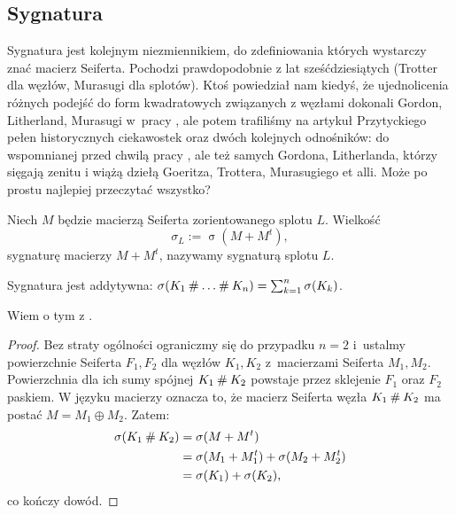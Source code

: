 
\subsection{Sygnatura}
\label{sub:signature}%
%
Sygnatura jest kolejnym niezmiennikiem, do zdefiniowania których wystarczy znać macierz Seiferta.
Pochodzi prawdopodobnie z lat sześćdziesiątych (Trotter \cite{trotter1962} dla węzłów, Murasugi \cite{murasugi1965} dla splotów).
%
%
Ktoś powiedział nam kiedyś, że ujednolicenia różnych podejść do form kwadratowych związanych z węzłami dokonali Gordon, Litherland, Murasugi w~pracy \cite{litherland1981}, ale potem trafiliśmy na artykuł Przytyckiego \cite{przytycki2011} pełen historycznych ciekawostek oraz dwóch kolejnych odnośników: do wspomnianej przed chwilą pracy \cite{murasugi1965}, ale też \cite{gordon1978} samych Gordona, Litherlanda, którzy sięgają zenitu i wiążą dziełą Goeritza, Trottera, Murasugiego et alli.
Może po prostu najlepiej przeczytać wszystko?

\begin{definition}[sygnatura]
\label{def:signature}%
    Niech $M$ będzie macierzą Seiferta zorientowanego splotu $L$.
    Wielkość
    \begin{equation}
        \sigma_L := \operatorname{\sigma} (M + M^t),
    \end{equation}
    sygnaturę macierzy $M + M^t$, nazywamy sygnaturą splotu $L$.
\end{definition}

\begin{proposition}
\label{prp:signature_additive}%
    Sygnatura jest addytywna: $\sigma(K_1 \mathbin{\#} \ldots \mathbin{\#} K_n) = \sum_{k=1}^n \sigma(K_k)$.
\end{proposition}

Wiem o tym z \cite[s. 127]{murasugi1996}.

\begin{proof}
    Bez straty ogólności ograniczmy się do przypadku $n = 2$ i~ustalmy powierzchnie Seiferta $F_1, F_2$ dla węzłów $K_1, K_2$ z~macierzami Seiferta $M_1, M_2$.
    Powierzchnia dla ich sumy spójnej $K_1 \mathbin{\#} K_2$ powstaje przez sklejenie $F_1$ oraz $F_2$ paskiem.
    W języku macierzy oznacza to, że macierz Seiferta węzła $K_1 \mathbin{\#} K_2$ ma postać $M = M_1 \oplus M_2$.
    Zatem:
    \begin{align}
        \sigma(K_1 \mathbin{\#} K_2) & = \sigma(M + M^t) \\
                               & = \sigma(M_1 + M_1^t) + \sigma(M_2 + M_2^t) \\
                               & = \sigma(K_1) + \sigma(K_2),
    \end{align}
    co kończy dowód.
\end{proof}

